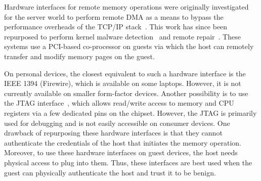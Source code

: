 %
Hardware interfaces for remote memory operations were originally investigated
for the server world to perform remote DMA as a means to bypass the performance
overheads of the TCP/IP stack~\cite{mellanox,infiniband}.  This work has since
been repurposed to perform kernel malware detection~\cite{copilot:sec04} and
remote repair~\cite{backdoor:icac04}. These systems use a PCI-based
co-processor on guests via which the host can remotely transfer and modify
memory pages on the guest.

On personal devices, the closest equivalent to such a hardware interface is the
IEEE 1394 (Firewire), which is available on some laptops. However, it is not
currently available on smaller form-factor devices.  Another possibility is to
use the JTAG interface~\cite{jtag}, which allows read/write access to memory
and CPU registers via a few dedicated pins on the chipset.  However, the JTAG
is primarily used for debugging and is not easily accessible on consumer
devices.  One drawback of repurposing these hardware interfaces is that they
cannot authenticate the credentials of the host that initiates the memory
operation. Moreover, to use these hardware interfaces on guest devices, the
host needs physical access to plug into them.  Thus, these interfaces are best
used when the guest can physically authenticate the host and trust it to be
benign.


% 


